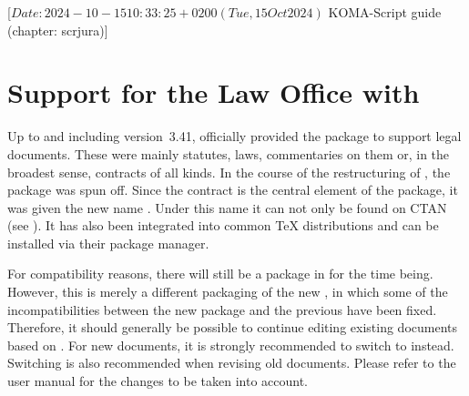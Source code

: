 %
%
%
%
%
%
%

%
                 [$Date: 2024-10-15 10:33:25 +0200 (Tue, 15 Oct 2024) $
                  KOMA-Script guide (chapter: scrjura)]


\chapter{Support for the Law Office with }
\BeginIndexGroup
{}

Up to and including version~3.41, \KOMAScript{} officially provided the
package  to support legal documents. These were mainly
statutes, laws, commentaries on them or, in the broadest sense, contracts of
all kinds. In the course of the restructuring of \KOMAScript{}, the package
was spun off. Since the contract is the central element of the package, it was
given the new name . Under this name it can not only be
found on CTAN (see \cite{package:contract}). It has also been integrated into
common \TeX{} distributions and can be installed via their package manager.

For compatibility reasons, there will still be a package  in
\KOMAScript{} for the time being. However, this is merely a different
packaging of the new , in which some of the
incompatibilities between the new package and the previous 
have been fixed. Therefore, it should generally be possible to continue
editing existing documents based on . For new documents, it
is strongly recommended to switch to  instead. Switching is
also recommended when revising old documents. Please refer to the
 user manual for the changes to be taken into account.

